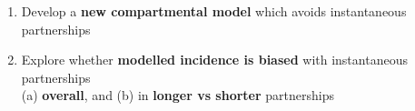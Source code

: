 \begin{enumerate}[label=(\arabic*),left=0pt]
  \item Develop a \textbf{new compartmental model} which avoids instantaneous partnerships
  \item Explore whether \textbf{modelled incidence is biased} with instantaneous partnerships\\
  (a) \textbf{overall}, and
  (b) in \textbf{longer vs shorter} partnerships
\end{enumerate}